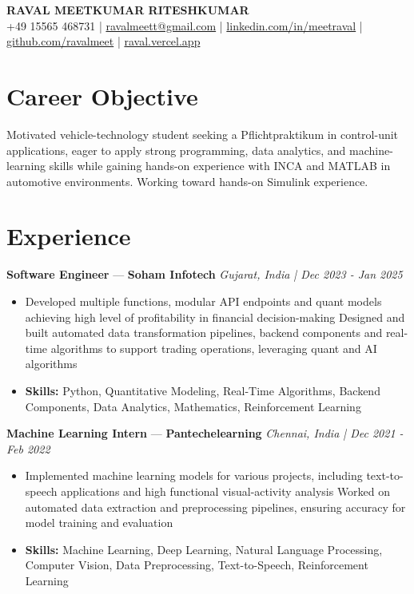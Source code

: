 \documentclass[a4paper,10pt]{article}
\begin{document}
\begin{center}
  {\Large\bfseries RAVAL MEETKUMAR RITESHKUMAR}\\[2pt]
  {\small +49 15565 468731 \;|\; \href{mailto:ravalmeett@gmail.com}{ravalmeett@gmail.com} \;|\; \href{https://www.linkedin.com/in/meetraval/}{linkedin.com/in/meetraval} \;|\; \href{https://github.com/ravalmeet}{github.com/ravalmeet} \;|\; \href{https://raval.vercel.app/}{raval.vercel.app}}
\end{center}
\vspace{-3pt}

\section*{Career Objective}
Motivated vehicle-technology student seeking a Pflichtpraktikum in control-unit applications, eager to apply strong programming, data analytics, and machine-learning skills while gaining hands-on experience with INCA and MATLAB in automotive environments. Working toward hands-on Simulink experience.\par

\section*{Experience}
\textbf{Software Engineer} — \textbf{Soham Infotech} \hfill \textit{Gujarat, India \;|\; Dec 2023 - Jan 2025}\par
\vspace{1pt}
\begin{itemize}
  \item Developed multiple functions, modular API endpoints and quant models achieving high level of profitability in financial decision-making Designed and built automated data transformation pipelines, backend components and real-time algorithms to support trading operations, leveraging quant and AI algorithms
  \item \textbf{Skills:} Python, Quantitative Modeling, Real-Time Algorithms, Backend Components, Data Analytics, Mathematics, Reinforcement Learning
\end{itemize}
\vspace{3pt}
\textbf{Machine Learning Intern} — \textbf{Pantechelearning} \hfill \textit{Chennai, India \;|\; Dec 2021 - Feb 2022}\par
\vspace{1pt}
\begin{itemize}
  \item Implemented machine learning models for various projects, including text-to-speech applications and high functional visual-activity analysis Worked on automated data extraction and preprocessing pipelines, ensuring accuracy for model training and evaluation
  \item \textbf{Skills:} Machine Learning, Deep Learning, Natural Language Processing, Computer Vision, Data Preprocessing, Text-to-Speech, Reinforcement Learning
\end{itemize}
\end{document}

